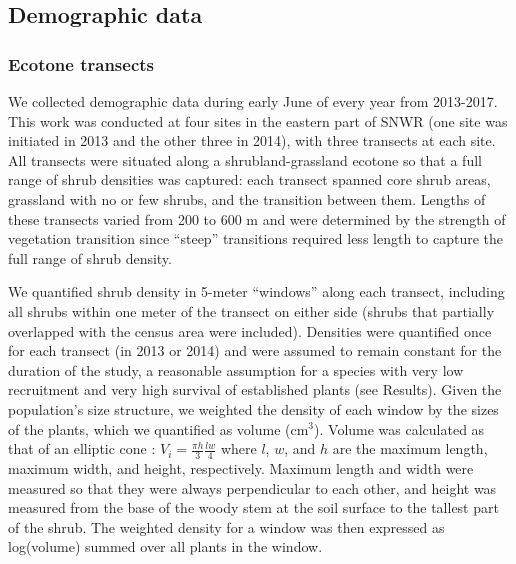 \documentclass[11pt]{article}\usepackage[]{graphicx}\usepackage[]{color}
\begin{document}
\subsection*{Demographic data}

\subsubsection*{Ecotone transects}

We collected demographic data during early June of every year from 2013-2017.
This work was conducted at four sites in the eastern part of SNWR (one site was initiated in 2013 and the other three in 2014), with three transects at each site. 
All transects were situated along a shrubland-grassland ecotone so that a full range of shrub densities was captured: each transect spanned core shrub areas, grassland with no or few shrubs, and the transition between them. 
Lengths of these transects varied from 200 to 600 m and were determined by the strength of vegetation transition since ``steep'' transitions required less length to capture the full range of shrub density. 

We quantified shrub density in 5-meter ``windows'' along each transect, including all shrubs within one meter of the transect on either side (shrubs that partially overlapped with the census area were included).
Densities were quantified once for each transect (in 2013 or 2014) and were assumed to remain constant for the duration of the study, a reasonable assumption for a species with very low recruitment and very high survival of established plants (see Results). 
Given the population's size structure, we weighted the density of each window by the sizes of the plants, which we quantified as volume (cm$^3$).
Volume was calculated as that of an elliptic cone \citep{mcauliffe2007landscape}: $V_{i} = \frac{\pi h}{3} \frac{lw}{4}$ where $l$, $w$, and $h$ are the maximum length, maximum width, and height, respectively.
Maximum length and width were measured so that they were always perpendicular to each other, and height was measured from the base of the woody stem at the soil surface to the tallest part of the shrub.
The weighted density for a window was then expressed as log(volume) summed over all plants in the window.
\end{document}
